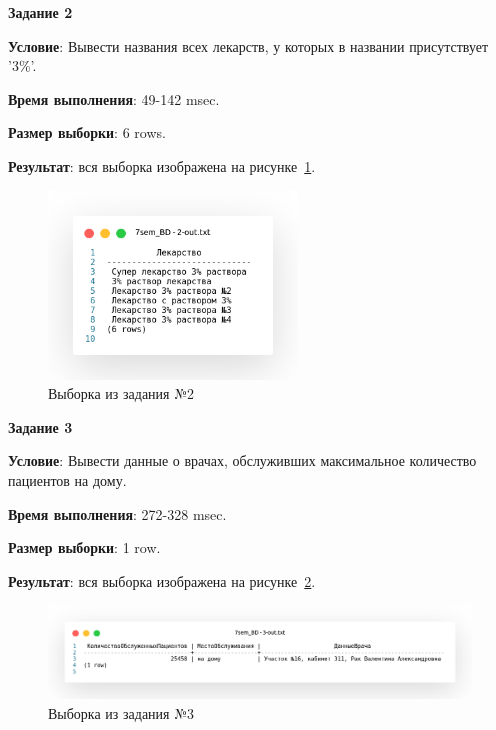 
\newpage

\begin{center}
  \textbf{Задание 2}
\end{center}
  
\textbf{Условие}:
Вывести названия всех лекарств, у которых в названии присутствует '3\%'.



\textbf{Время выполнения}: 49-142 msec.

\textbf{Размер выборки}: 6 rows.

\textbf{Результат}: вся выборка изображена на рисунке~\ref{fig:t2}.

\begin{figure}[!h]
  \centering

  \includegraphics[height=5cm]
  {../sql/task2/2-out.png}

  \caption{Выборка из задания №2}

  \label{fig:t2}
\end{figure}


\begin{center}
  \textbf{Задание 3}
\end{center}
  
\textbf{Условие}:
Вывести данные о врачах, обслуживших максимальное количество пациентов на дому.



\textbf{Время выполнения}: 272-328 msec.

\textbf{Размер выборки}: 1 row.

\textbf{Результат}: вся выборка изображена на рисунке~\ref{fig:t3}.

\begin{figure}[!h]
  \centering

  \includegraphics[width=18cm]
  {../sql/task3/3-out.png}

  \caption{Выборка из задания №3}

  \label{fig:t3}
\end{figure}

